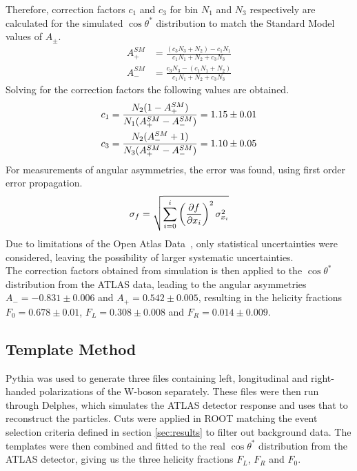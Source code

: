\documentclass[12pt,a4paper]{article}
\numberwithin{equation}{section}
\begin{document}
Therefore, correction factors $c_1$ and $c_3$ for bin $N_1$ and $N_3$ respectively are calculated for the simulated $\cos\theta^*$ distribution to match the Standard Model values of $A_{\pm}$.
\begin{align}
	A_{+}^{SM} &= \frac{(c_3N_3 + N_2) - c_1N_1}{c_1N_1 + N_2 + c_3N_3} \\
	A_{-}^{SM} &= \frac{c_3N_3 - (c_1N_1 + N_2)}{c_1N_1 + N_2 + c_3N_3}
\end{align}
Solving for the correction factors the following values are obtained.
\begin{align} \label{eq:correction}
	c_1 &= \frac{N_2(1-A_{+}^{SM})}{N_1(A_{+}^{SM} -A_{-}^{SM})} = \num{1.15 +- 0.01}  \\ 
	c_3 &= \frac{N_2(A_{-}^{SM}+1)}{N_3(A_{+}^{SM}-A_{-}^{SM})} = \num{1.10 +- 0.05}
\end{align}
For measurements of angular asymmetries, the error was found, using first order
error propagation.
\begin{align}
	\sigma_{f} = \sqrt{\sum_{i=0}^{i}\left(\pdv{f}{x_i}\right)^2\sigma_{x_i}^2}
\end{align}
Due to limitations of the Open Atlas Data~\cite{oreach2020}, only statistical uncertainties were considered, leaving the possibility of larger systematic uncertainties. \\

The correction factors obtained from simulation is then applied to the
$\cos\theta^{*}$ distribution from the ATLAS data, leading to the angular asymmetries $A_- = -0.831 \pm 0.006$ and
$A_+ = 0.542 \pm 0.005$, resulting in the helicity fractions
$F_0=0.678 \pm 0.01$, $F_L=0.308 \pm 0.008$ and $F_R=0.014 \pm 0.009$.




\subsection{Template Method}
Pythia was used to generate three files containing left, longitudinal and
right-handed polarizations of the W-boson separately. These files were then run
through Delphes, which simulates the ATLAS detector response and uses that to
reconstruct the particles. Cuts were applied in ROOT matching the event
selection criteria defined in section \ref{sec:results} to filter out background
data. The templates were then combined and fitted to the real $\cos \theta^{*}$
distribution from the ATLAS detector, giving us the three helicity fractions
$F_L$, $F_R$ and $F_0$.
\end{document}
